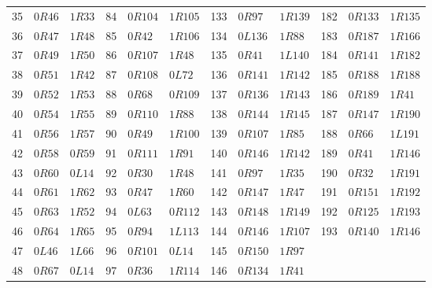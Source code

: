 \begin{longtable}{@{}rll@{\quad}rll@{\quad}rll@{\quad}rll@{}}
35 & $0R46$ & $1R33$ & 84 & $0R104$ & $1R105$ & 133 & $0R97$ & $1R139$ & 182 & $0R133$ & $1R135$ \\
36 & $0R47$ & $1R48$ & 85 & $0R42$ & $1R106$ & 134 & $0L136$ & $1R88$ & 183 & $0R187$ & $1R166$ \\
37 & $0R49$ & $1R50$ & 86 & $0R107$ & $1R48$ & 135 & $0R41$ & $1L140$ & 184 & $0R141$ & $1R182$ \\
38 & $0R51$ & $1R42$ & 87 & $0R108$ & $0L72$ & 136 & $0R141$ & $1R142$ & 185 & $0R188$ & $1R188$ \\
39 & $0R52$ & $1R53$ & 88 & $0R68$ & $0R109$ & 137 & $0R136$ & $1R143$ & 186 & $0R189$ & $1R41$ \\
40 & $0R54$ & $1R55$ & 89 & $0R110$ & $1R88$ & 138 & $0R144$ & $1R145$ & 187 & $0R147$ & $1R190$ \\
41 & $0R56$ & $1R57$ & 90 & $0R49$ & $1R100$ & 139 & $0R107$ & $1R85$ & 188 & $0R66$ & $1L191$ \\
42 & $0R58$ & $0R59$ & 91 & $0R111$ & $1R91$ & 140 & $0R146$ & $1R142$ & 189 & $0R41$ & $1R146$ \\
43 & $0R60$ & $0L14$ & 92 & $0R30$ & $1R48$ & 141 & $0R97$ & $1R35$ & 190 & $0R32$ & $1R191$ \\
44 & $0R61$ & $1R62$ & 93 & $0R47$ & $1R60$ & 142 & $0R147$ & $1R47$ & 191 & $0R151$ & $1R192$ \\
45 & $0R63$ & $1R52$ & 94 & $0L63$ & $0R112$ & 143 & $0R148$ & $1R149$ & 192 & $0R125$ & $1R193$ \\
46 & $0R64$ & $1R65$ & 95 & $0R94$ & $1L113$ & 144 & $0R146$ & $1R107$ & 193 & $0R140$ & $1R146$ \\
47 & $0L46$ & $1L66$ & 96 & $0R101$ & $0L14$ & 145 & $0R150$ & $1R97$ &  &  &  \\
48 & $0R67$ & $0L14$ & 97 & $0R36$ & $1R114$ & 146 & $0R134$ & $1R41$ &  &  &  \\
\end{longtable}
\endgroup

